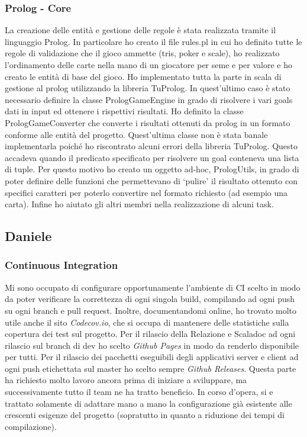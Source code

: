 \subsubsection{Prolog - Core}
La creazione delle entità e gestione delle regole è stata realizzata tramite il linguaggio Prolog.
In particolare ho creato il file rules.pl in cui ho definito tutte le regole di validazione che il gioco ammette (tris, poker e scale), ho realizzato l’ordinamento delle carte nella mano di un giocatore per seme e per valore e ho creato le entità di base del gioco.
Ho implementato tutta la parte in scala di gestione al prolog utilizzando la libreria TuProlog.
In quest'ultimo caso è stato necessario definire la classe PrologGameEngine in grado di risolvere i vari goals dati in input ed ottenere i rispettivi risultati.
Ho definito la classe PrologGameConverter che converte i risultati ottenuti da prolog in un formato conforme alle entità del progetto.
Quest’ultima classe non è stata banale implementarla poiché ho riscontrato alcuni errori della libreria TuProlog.
Questo accadeva quando il predicato specificato per risolvere un goal conteneva una lista di tuple.
Per questo motivo ho creato un oggetto ad-hoc, PrologUtils, in grado di poter definire delle funzioni che permettevano di ‘pulire’ il risultato ottenuto con specifici caratteri per poterlo convertire nel formato richiesto (ad esempio una carta).
Infine ho aiutato gli altri membri nella realizzazione di alcuni task.
\subsection{Daniele}
\subsubsection{Continuous Integration}
Mi sono occupato di configurare opportunamente l'ambiente di CI scelto in modo da poter verificare la correttezza di ogni singola build, compilando ad ogni push su ogni branch e pull request.
Inoltre, documentandomi online, ho trovato molto utile anche il sito \textit{Codecov.io}, che si occupa di mantenere delle statistiche sulla copertura dei test sul progetto.
Per il rilascio della Relazione e Scaladoc ad ogni rilascio sul branch di dev ho scelto \textit{Github Pages} in modo da renderlo disponibile per tutti.
Per il rilascio dei pacchetti eseguibili degli applicativi server e client ad ogni push etichettata sul master ho scelto sempre \textit{Github Releases}.
Questa parte ha richiesto molto lavoro ancora prima di iniziare a sviluppare, ma successivamente tutto il team ne ha tratto beneficio.
In corso d'opera, si e trattato solamente di adattare mano a mano la configurazione già esistente alle crescenti esigenze del progetto (sopratutto in quanto a riduzione dei tempi di compilazione).

